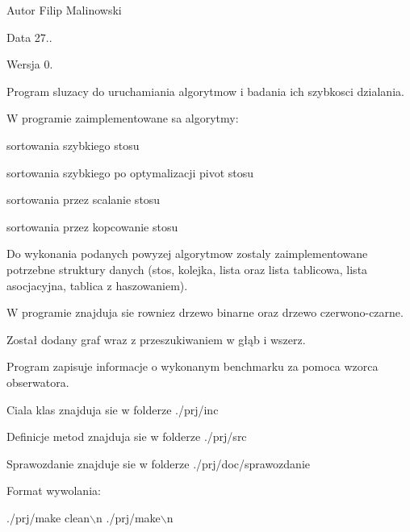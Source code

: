 \begin{DoxyAuthor}{Autor}
Filip Malinowski 
\end{DoxyAuthor}
\begin{DoxyDate}{Data}
27.. 
\end{DoxyDate}
\begin{DoxyVersion}{Wersja}
0.
\end{DoxyVersion}
Program sluzacy do uruchamiania algorytmow i badania ich szybkosci dzialania.\par
W programie zaimplementowane sa algorytmy\-:\par

\begin{DoxyItemize}
\item sortowania szybkiego stosu\par

\item sortowania szybkiego po optymalizacji pivot stosu\par

\item sortowania przez scalanie stosu\par

\item sortowania przez kopcowanie stosu
\end{DoxyItemize}

Do wykonania podanych powyzej algorytmow zostaly zaimplementowane potrzebne struktury danych (stos, kolejka, lista oraz lista tablicowa, lista asocjacyjna, tablica z haszowaniem).\par
\par
W programie znajduja sie rowniez drzewo binarne oraz drzewo czerwono-\/czarne.\par
Został dodany graf wraz z przeszukiwaniem w głąb i wszerz.\par
Program zapisuje informacje o wykonanym benchmarku za pomoca wzorca obserwatora.\par
\par
Ciala klas znajduja sie w folderze ./prj/inc\par
Definicje metod znajduja sie w folderze ./prj/src\par
Sprawozdanie znajduje sie w folderze ./prj/doc/sprawozdanie\par
\par
Format wywolania\-:\par

\begin{DoxyCode}
./prj/make clean\(\backslash\)n
./prj/make\(\backslash\)n
\end{DoxyCode}
 